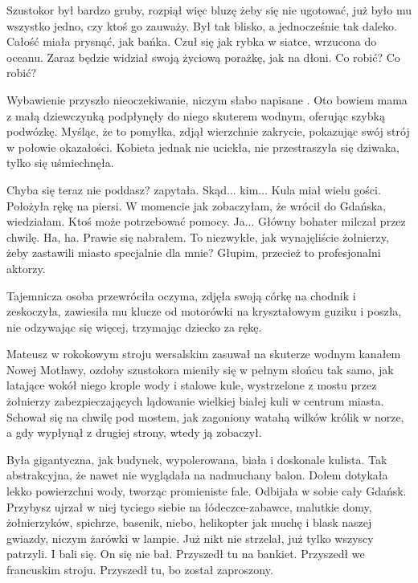 Szustokor był bardzo gruby, rozpiął więc bluzę żeby się nie ugotować, już było mu wszystko jedno, czy ktoś go zauważy.
Był tak blisko, a jednocześnie tak daleko. Całość miała prysnąć, jak bańka.
Czuł się jak rybka w siatce, wrzucona do oceanu.
Zaraz będzie widział swoją życiową porażkę, jak na dłoni.
Co robić? Co robić?

Wybawienie przyszło nieoczekiwanie, niczym słabo napisane .
Oto bowiem mama z małą dziewczynką podpłynęły do niego skuterem wodnym, oferując szybką podwózkę.
Myśląc, że to pomyłka, zdjął wierzchnie zakrycie, pokazując swój strój w połowie okazałości.
Kobieta jednak nie uciekła, nie przestraszyła się dziwaka, tylko się uśmiechnęła.

\begin{dialogue}
\ds{} Chyba się teraz nie poddasz? \dm{} zapytała.
\ds{} Skąd... kim...
\ds{} Kula miał wielu gości. \dm{} Położyła rękę na piersi. \dm{} W momencie jak zobaczyłam, że wrócił do Gdańska, wiedziałam. Ktoś może potrzebować pomocy.
\ds{} Ja... \dm{} Główny bohater milczał przez chwilę. \dm{} Ha, ha. Prawie się nabrałem.
To niezwykłe, jak wynajęliście żołnierzy, żeby zastawili miasto specjalnie dla mnie? Głupim, przecież to profesjonalni aktorzy.
\end{dialogue}

Tajemnicza osoba przewróciła oczyma, zdjęła swoją córkę na chodnik i zeskoczyła, zawiesiła mu klucze od motorówki na kryształowym guziku i poszła, nie odzywając się więcej, trzymając dziecko za rękę.

Mateusz w rokokowym stroju wersalskim zasuwał na skuterze wodnym kanałem Nowej Motławy, ozdoby szustokora mieniły się w pełnym słońcu tak samo, jak latające wokół niego
krople wody i stalowe kule, wystrzelone z mostu przez żołnierzy zabezpieczających lądowanie wielkiej białej kuli w centrum miasta.
Schował się na chwilę pod mostem, jak zagoniony watahą wilków królik w norze, a gdy wypłynął z drugiej strony, wtedy ją zobaczył.

Była gigantyczna, jak budynek, wypolerowana, biała i doskonale kulista. Tak abstrakcyjna, że nawet nie wyglądała na nadmuchany balon.
Dołem dotykała lekko powierzchni wody, tworząc promieniste fale.
Odbijała w sobie cały Gdańsk.
Przybysz ujrzał w niej tyciego siebie na łódeczce-zabawce, malutkie domy, żołnierzyków, spichrze, basenik, niebo, helikopter jak muchę i blask naszej gwiazdy, niczym żarówki w lampie.
Już nikt nie strzelał, już tylko wszyscy patrzyli. I bali się.
On się nie bał. 
Przyszedł tu na bankiet.
Przyszedł we francuskim stroju.
Przyszedł tu, bo został zaproszony.


